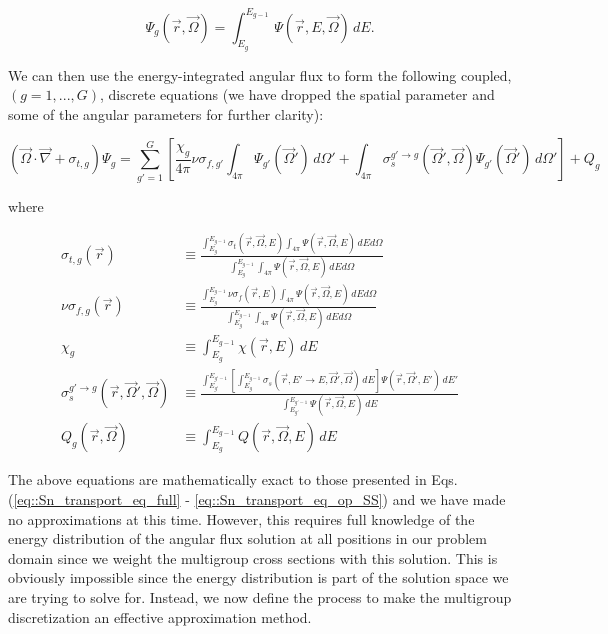 \begin{equation}
\label{eq::Sn_MG_ang_flux_g}
\Psi_g (\vec{r}, \vec{\Omega}) = \int_{E_g}^{E_{g-1}} \, \Psi (\vec{r}, E, \vec{\Omega}) \, dE .
\end{equation}

\noindent We can then use the energy-integrated angular flux to form the following coupled, $(g=1,...,G)$, discrete equations (we have dropped the spatial parameter and some of the angular parameters for further clarity):

\begin{equation}
\label{eq::Sn_MG_trans_eq}
\left(  \vec{\Omega} \cdot \vec{\nabla} + \sigma_{t,g}  \right) \Psi_g =  \sum_{g'=1}^{G} \left[ \frac{\chi_g}{4 \pi} \nu \sigma_{f,g'} \int_{4 \pi} \Psi_{g'} (\vec{\Omega}') \, d\Omega' + \int_{4 \pi} \sigma_{s}^{g' \rightarrow g} (\vec{\Omega}' , \vec{\Omega} ) \Psi_{g'} (\vec{\Omega}')  \, d\Omega'  \right] + Q_g
\end{equation}

\noindent where

\begin{equation}
\label{eq::Sn_MG_exact_condensed_terms}
\begin{aligned}
\sigma_{t,g} (\vec{r}) & \equiv \frac{\int_{E_{g}}^{E_{g-1}} \sigma_{t} (\vec{r},\vec{\Omega},E) \int_{4 \pi} \Psi (\vec{r},\vec{\Omega}, E) \, dE d\Omega}{\int_{E_{g}}^{E_{g-1}} \int_{4 \pi} \Psi (\vec{r},\vec{\Omega}, E) \, dE d\Omega}\\
\nu\sigma_{f,g} (\vec{r}) & \equiv \frac{\int_{E_{g}}^{E_{g-1}} \nu\sigma_{f} (\vec{r},E)  \int_{4 \pi} \Psi (\vec{r},\vec{\Omega}, E) \, dE d\Omega}{\int_{E_{g}}^{E_{g-1}} \int_{4 \pi} \Psi (\vec{r},\vec{\Omega}, E) \, dE d\Omega} \\
\chi_g & \equiv \int_{E_{g}}^{E_{g-1}} \chi  (\vec{r},E) \, dE \\
\sigma_{s}^{g' \rightarrow g} (\vec{r},\vec{\Omega}' , \vec{\Omega} ) & \equiv \frac{\int_{E_{g'}}^{E_{g'-1}} \left[ \int_{E_{g}}^{E_{g-1}} \sigma_s (\vec{r},E' \rightarrow E,\vec{\Omega}' , \vec{\Omega} ) \, dE \right] \Psi (\vec{r},\vec{\Omega}', E') \, dE' }{\int_{E_{g'}}^{E_{g'-1}}  \Psi (\vec{r},\vec{\Omega}, E) \, dE} \\
Q_g (\vec{r}, \vec{\Omega}) & \equiv \int_{E_{g}}^{E_{g-1}} Q (\vec{r}, \vec{\Omega}, E) \, dE
\end{aligned}
\end{equation}

The above equations are mathematically exact to those presented in Eqs. (\ref{eq::Sn_transport_eq_full} - \ref{eq::Sn_transport_eq_op_SS}) and we have made no approximations at this time. However, this requires full knowledge of the energy distribution of the angular flux solution at all positions in our problem domain since we weight the multigroup cross sections with this solution. This is obviously impossible since the energy distribution is part of the solution space we are trying to solve for. Instead, we now define the process to make the multigroup discretization an effective approximation method.

